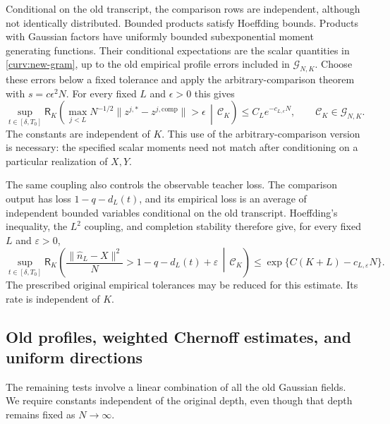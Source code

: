 \documentclass[11pt,reqno]{amsart}
\begin{document}
Conditional on the old transcript, the comparison rows are independent,
although not identically distributed. Bounded products satisfy Hoeffding
bounds. Products with Gaussian factors have uniformly bounded
subexponential moment generating functions. Their conditional expectations
are the scalar quantities in \eqref{curv:new-gram}, up to the old empirical
profile errors included in $\mathcal G_{N,K}$. Choose these errors below a
fixed tolerance and apply the arbitrary-comparison theorem with
$s=c\epsilon^2N$. For every fixed $L$ and $\epsilon>0$ this gives
\begin{equation}\label{curv:coupling-rate}
 \sup_{t\in[\delta,T_0]}
 \mathsf R_K\left(\max_{j<L}
       N^{-1/2}\|z^{j,*}-z^{j,\mathrm{comp}}\|>\epsilon
                  \,\middle|\,\mathcal C_K\right)
       \le C_L e^{-c_{L,\epsilon}N},
 \qquad \mathcal C_K\in\mathcal G_{N,K}.
\end{equation}
The constants are independent of $K$. This use of the arbitrary-comparison
version is necessary: the specified scalar moments need not match after
conditioning on a particular realization of $X,Y$.

The same coupling also controls the observable teacher loss. The
comparison output has loss $1-q-d_L(t)$, and its empirical loss is an
average of independent bounded variables conditional on the old
transcript. Hoeffding's inequality, the $L^2$ coupling, and completion
stability therefore give, for every fixed $L$ and $\varepsilon>0$,
\begin{equation}\label{curv:teacher-loss}
 \sup_{t\in[\delta,T_0]}
 \mathsf R_K\left(
   \frac{\|\widehat n_L-X\|^2}{N}
       >1-q-d_L(t)+\varepsilon
              \,\middle|\,\mathcal C_K\right)
     \le \exp\{C(K+L)-c_{L,\varepsilon}N\}.
\end{equation}
The prescribed original empirical tolerances may be reduced for this
estimate. Its rate is independent of $K$.

\subsection{Old profiles, weighted Chernoff estimates, and uniform directions}
\label{curv:profiles}

The remaining tests involve a linear combination of all the old Gaussian
fields. We require constants independent of the original depth, even
though that depth remains fixed as $N\to\infty$.
\end{document}
